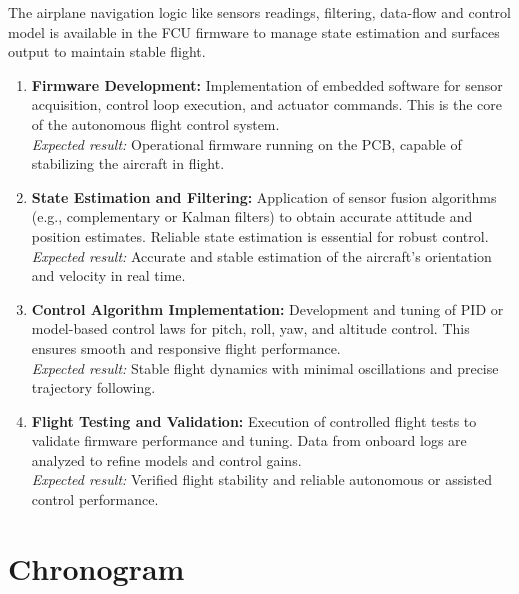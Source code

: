 The airplane navigation logic like sensors readings, filtering, data-flow and control model is available in the FCU firmware to manage state estimation and surfaces output to maintain stable flight.

\begin{enumerate}
    \item \textbf{Firmware Development:} Implementation of embedded software for sensor acquisition, control loop execution, and actuator commands. This is the core of the autonomous flight control system. \\
    \textit{Expected result:} Operational firmware running on the PCB, capable of stabilizing the aircraft in flight.

    \item \textbf{State Estimation and Filtering:} Application of sensor fusion algorithms (e.g., complementary or Kalman filters) to obtain accurate attitude and position estimates. Reliable state estimation is essential for robust control. \\
    \textit{Expected result:} Accurate and stable estimation of the aircraft’s orientation and velocity in real time.

    \item \textbf{Control Algorithm Implementation:} Development and tuning of PID or model-based control laws for pitch, roll, yaw, and altitude control. This ensures smooth and responsive flight performance. \\
    \textit{Expected result:} Stable flight dynamics with minimal oscillations and precise trajectory following.

    \item \textbf{Flight Testing and Validation:} Execution of controlled flight tests to validate firmware performance and tuning. Data from onboard logs are analyzed to refine models and control gains. \\
    \textit{Expected result:} Verified flight stability and reliable autonomous or assisted control performance.
\end{enumerate}

\section{Chronogram}

